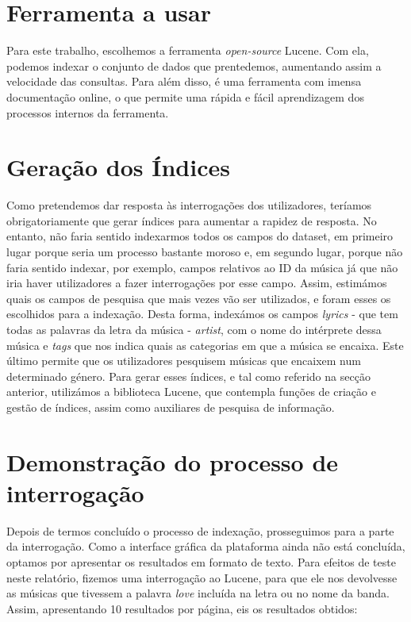 \documentclass[twocolumn,twoside,10pt,a4paper]{article}
\begin{document}
\section{Ferramenta a usar}\label{sec:ferramenta}

Para este trabalho, escolhemos a ferramenta \textit{open-source} Lucene. Com ela, podemos indexar o conjunto de dados que prentedemos, aumentando assim a velocidade das consultas. Para além disso, é uma ferramenta com imensa documentação online, o que permite uma rápida e fácil aprendizagem dos processos internos da ferramenta.

\section{Geração dos Índices}\label{sec:indices}

Como pretendemos dar resposta às interrogações dos utilizadores, teríamos obrigatoriamente que gerar índices para aumentar a rapidez de resposta. No entanto, não faria sentido indexarmos todos os campos do dataset, em primeiro lugar porque seria um processo bastante moroso e, em segundo lugar, porque não faria sentido indexar, por exemplo, campos relativos ao ID da música já que não iria haver utilizadores a fazer interrogações por esse campo. Assim, estimámos quais os campos de pesquisa que mais vezes vão ser utilizados, e foram esses os escolhidos para a indexação. Desta forma, indexámos os campos \textit{lyrics} - que tem todas as palavras da letra da música - \textit{artist}, com o nome do intérprete dessa música e \textit{tags} que nos indica quais as categorias em que a música se encaixa. Este último permite que os utilizadores pesquisem músicas que encaixem num determinado género. Para gerar esses índices, e tal como referido na secção anterior, utilizámos a biblioteca Lucene, que contempla funções de criação e gestão de índices, assim como auxiliares de pesquisa de informação.


\section{Demonstração do processo de interrogação}\label{sec:demonstração}

Depois de termos concluído o processo de indexação, prosseguimos para a parte da interrogação. Como a interface gráfica da plataforma ainda não está concluída, optamos por apresentar os resultados em formato de texto. Para efeitos de teste neste relatório, fizemos uma interrogação ao Lucene, para que ele nos devolvesse as músicas que tivessem a palavra \textit{love} incluída na letra ou no nome da banda. Assim, apresentando 10 resultados por página, eis os resultados obtidos:
\end{document}
